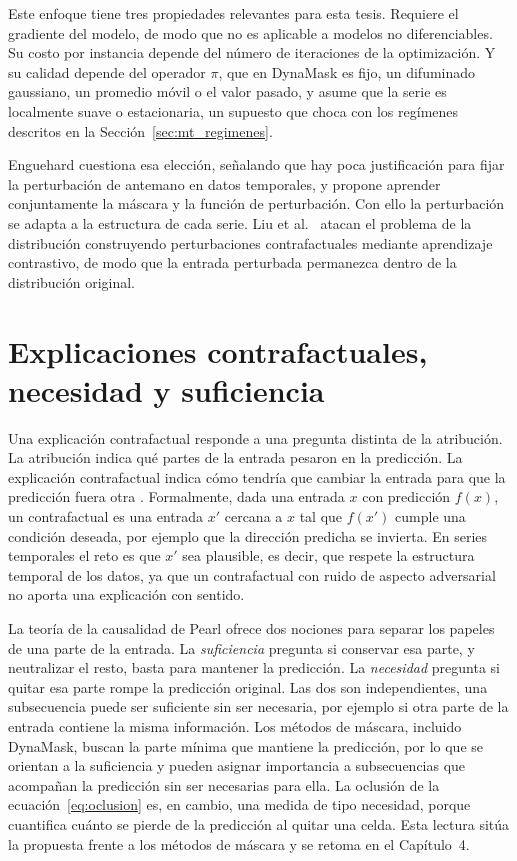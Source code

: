 Este enfoque tiene tres propiedades relevantes para esta tesis. Requiere el gradiente del modelo, de modo que no es aplicable a modelos no diferenciables. Su costo por instancia depende del número de iteraciones de la optimización. Y su calidad depende del operador $\pi$, que en DynaMask es fijo, un difuminado gaussiano, un promedio móvil o el valor pasado, y asume que la serie es localmente suave o estacionaria, un supuesto que choca con los regímenes descritos en la Sección~\ref{sec:mt_regimenes}.

Enguehard \cite{enguehard2023} cuestiona esa elección, señalando que hay poca justificación para fijar la perturbación de antemano en datos temporales, y propone aprender conjuntamente la máscara y la función de perturbación. Con ello la perturbación se adapta a la estructura de cada serie. Liu et al.\ \cite{liu2024contralsp} atacan el problema de la distribución construyendo perturbaciones contrafactuales mediante aprendizaje contrastivo, de modo que la entrada perturbada permanezca dentro de la distribución original.

\section{Explicaciones contrafactuales, necesidad y suficiencia}
\label{sec:mt_contrafactual}

Una explicación contrafactual responde a una pregunta distinta de la atribución. La atribución indica qué partes de la entrada pesaron en la predicción. La explicación contrafactual indica cómo tendría que cambiar la entrada para que la predicción fuera otra \cite{wachter2017}. Formalmente, dada una entrada $x$ con predicción $f(x)$, un contrafactual es una entrada $x'$ cercana a $x$ tal que $f(x')$ cumple una condición deseada, por ejemplo que la dirección predicha se invierta. En series temporales el reto es que $x'$ sea plausible, es decir, que respete la estructura temporal de los datos, ya que un contrafactual con ruido de aspecto adversarial no aporta una explicación con sentido.

La teoría de la causalidad de Pearl \cite{pearl2009} ofrece dos nociones para separar los papeles de una parte de la entrada. La \emph{suficiencia} pregunta si conservar esa parte, y neutralizar el resto, basta para mantener la predicción. La \emph{necesidad} pregunta si quitar esa parte rompe la predicción original. Las dos son independientes, una subsecuencia puede ser suficiente sin ser necesaria, por ejemplo si otra parte de la entrada contiene la misma información. Los métodos de máscara, incluido DynaMask, buscan la parte mínima que mantiene la predicción, por lo que se orientan a la suficiencia y pueden asignar importancia a subsecuencias que acompañan la predicción sin ser necesarias para ella. La oclusión de la ecuación~\eqref{eq:oclusion} es, en cambio, una medida de tipo necesidad, porque cuantifica cuánto se pierde de la predicción al quitar una celda. Esta lectura sitúa la propuesta frente a los métodos de máscara y se retoma en el Capítulo~4.

